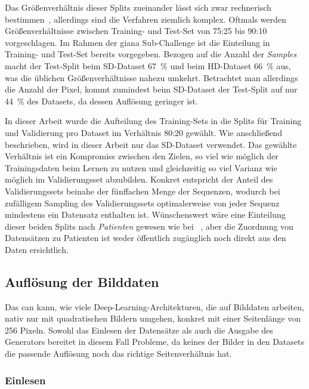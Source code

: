 Das Größenverhältnis dieser Splits zueinander lässt sich zwar rechnerisch bestimmen~\cite{Guyon.1998,Guyon.1997}, allerdings sind die Verfahren ziemlich komplex.
Oftmals werden Größenverhältnisse zwischen Training- und Test-Set von 75:25 bis 90:10 vorgeschlagen.
Im Rahmen der \gls{giana} Sub-Challenge ist die Einteilung in Training- und Test-Set bereits vorgegeben.
Bezogen auf die Anzahl der \emph{Samples} macht der Test-Split beim SD-Dataset 67~\% und beim HD-Dataset 66~\% aus, was die üblichen Größenverhältnisse nahezu umkehrt.
Betrachtet man allerdings die Anzahl der Pixel, kommt zumindest beim SD-Dataset der Test-Split auf nur 44~\% des Datasets, da dessen Auflösung geringer ist.

In dieser Arbeit wurde die Aufteilung des Training-Sets in die Splits für Training und Validierung pro Dataset im Verhältnis 80:20 gewählt.
Wie anschließend beschrieben, wird in dieser Arbeit nur das SD-Dataset verwendet.
Das gewählte Verhältnis ist ein Kompromiss zwischen den Zielen, so viel wie möglich der Trainingsdaten beim Lernen zu nutzen und gleichzeitig so viel Varianz wie möglich im Validierungsset abzubilden.
Konkret entspricht der Anteil des Validierungssets beinahe der fünffachen Menge der Sequenzen, wodurch bei zufälligem Sampling des Validierungssets optimalerweise von jeder Sequenz mindestens ein Datensatz enthalten ist.
Wünschenswert wäre eine Einteilung dieser beiden Splits nach \emph{Patienten} gewesen wie bei \citeauthor{Vazquez.2017}~\cite{Vazquez.2017}, aber die Zuordnung von Datensätzen zu Patienten ist weder öffentlich zugänglich noch direkt aus den Daten ersichtlich.



\subsection{Auflösung der Bilddaten}

Das \gls{can} kann, wie viele Deep-Learning-Architekturen, die auf Bilddaten arbeiten, nativ nur mit quadratischen Bildern umgehen, konkret mit einer Seitenlänge von 256 Pixeln.
Sowohl das Einlesen der Datensätze als auch die Ausgabe des Generators bereitet in diesem Fall Probleme, da keines der Bilder in den Datasets die passende Auflösung noch das richtige Seitenverhältnis hat.



\subsubsection{Einlesen}

